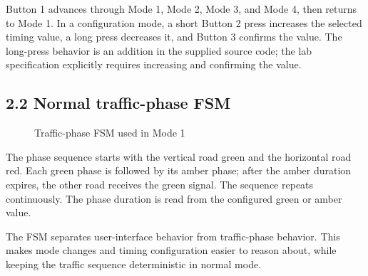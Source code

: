 Button 1 advances through Mode 1, Mode 2, Mode 3, and Mode 4, then returns to Mode 1. In a configuration mode, a short Button 2 press increases the selected timing value, a long press decreases it, and Button 3 confirms the value. The long-press behavior is an addition in the supplied source code; the lab specification explicitly requires increasing and confirming the value.

\subsection*{2.2 Normal traffic-phase FSM}
\begin{figure}[H]
    \centering
    \caption{Traffic-phase FSM used in Mode 1}
    \label{fig:exercise1_traffic_fsm}
\end{figure}

The phase sequence starts with the vertical road green and the horizontal road red. Each green phase is followed by its amber phase; after the amber duration expires, the other road receives the green signal. The sequence repeats continuously. The phase duration is read from the configured green or amber value.

\vspace{0.2cm}
\begin{resultbox}
The FSM separates user-interface behavior from traffic-phase behavior. This makes mode changes and timing configuration easier to reason about, while keeping the traffic sequence deterministic in normal mode.
\end{resultbox}
